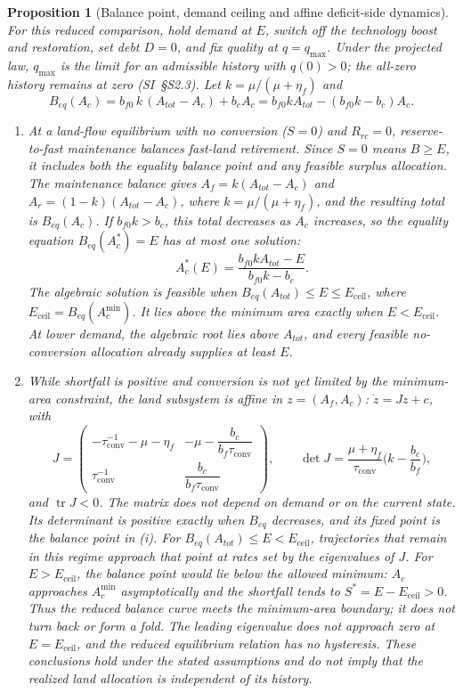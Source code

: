 \documentclass[preprint,12pt,authoryear]{elsarticle}
\newtheorem{proposition}{Proposition}
\newcommand{\Eceil}{E_{\mathrm{ceil}}}
\newcommand{\Acmin}{A_c^{\min}}
\newcommand{\tconv}{\tau_{\mathrm{conv}}}
\begin{document}
\begin{proposition}[Balance point, demand ceiling and affine deficit-side dynamics]\label{prop:ceiling}
For this reduced comparison, hold demand at $E$, switch off the technology boost and restoration, set debt $D=0$, and fix quality at $q=q_{\max}$. Under the projected law, $q_{\max}$ is the limit for an admissible history with $q(0)>0$; the all-zero history remains at zero (SI~\S S2.3). Let $k=\mu/(\mu+\eta_f)$ and
\begin{equation}\label{eq:Beq}
B_{eq}(A_c)=b_{f0}\,k\,(A_{tot}-A_c)+b_cA_c=b_{f0}kA_{tot}-(b_{f0}k-b_c)A_c .
\end{equation}
\begin{enumerate}[label=(\roman*)]
\item At a land-flow equilibrium with no conversion ($S=0$) and $R_{rc}=0$, reserve-to-fast maintenance balances fast-land retirement. Since $S=0$ means $B\ge E$, it includes both the equality balance point and any feasible surplus allocation. The maintenance balance gives $A_f=k(A_{tot}-A_c)$ and $A_r=(1-k)(A_{tot}-A_c)$, where $k=\mu/(\mu+\eta_f)$, and the resulting total is $B_{eq}(A_c)$. If $b_{f0}k>b_c$, this total decreases as $A_c$ increases, so the equality equation $B_{eq}(A_c^*)=E$ has at most one solution:
\begin{equation}\label{eq:Acstar}
A_c^*(E)=\frac{b_{f0}kA_{tot}-E}{b_{f0}k-b_c}.
\end{equation}
The algebraic solution is feasible when $B_{eq}(A_{tot})\le E\le\Eceil$, where $\Eceil=B_{eq}(\Acmin)$. It lies above the minimum area exactly when $E<\Eceil$. At lower demand, the algebraic root lies above $A_{tot}$, and every feasible no-conversion allocation already supplies at least $E$.
\item While shortfall is positive and conversion is not yet limited by the minimum-area constraint, the land subsystem is affine in $z=(A_f,A_c)$: $\dot z=Jz+c$, with
\begin{equation}\label{eq:J}
J=\begin{pmatrix}-\tconv^{-1}-\mu-\eta_f & -\mu-\dfrac{b_c}{b_f\tconv}\\[8pt] \tconv^{-1} & \dfrac{b_c}{b_f\tconv}\end{pmatrix},
\qquad \det J=\frac{\mu+\eta_f}{\tconv}\Big(k-\frac{b_c}{b_f}\Big),
\end{equation}
and $\operatorname{tr}J<0$. The matrix does not depend on demand or on the current state. Its determinant is positive exactly when $B_{eq}$ decreases, and its fixed point is the balance point in (i). For $B_{eq}(A_{tot})\le E<\Eceil$, trajectories that remain in this regime approach that point at rates set by the eigenvalues of $J$. For $E>\Eceil$, the balance point would lie below the allowed minimum: $A_c$ approaches $\Acmin$ asymptotically and the shortfall tends to $S^*=E-\Eceil>0$. Thus the reduced balance curve meets the minimum-area boundary; it does not turn back or form a fold. The leading eigenvalue does not approach zero at $E=\Eceil$, and the reduced equilibrium relation has no hysteresis. These conclusions hold under the stated assumptions and do not imply that the realized land allocation is independent of its history.

\end{enumerate}
\end{proposition}
\end{document}
